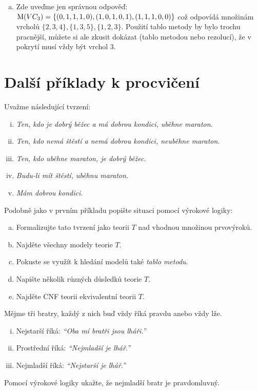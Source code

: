 \begin{problem}
\begin{solution}
\begin{enumerate}[(a)]
            \item Zde uveďme jen správnou odpověď: $\operatorname{M}(VC_3)=\{(0,1,1,1,0),(1,0,1,0,1),(1,1,1,0,0)\}$ což odpovídá množinám vrcholů $\{2,3,4\},\{1,3,5\},\{1,2,3\}$. Použití tablo metody by bylo trochu pracnější, můžete si ale zkusit dokázat (tablo metodou nebo rezolucí), že v pokrytí musí vždy být vrchol 3.
        \end{enumerate}
    \end{solution}

\end{problem}


\section*{Další příklady k procvičení}


\begin{problem}
    
    Uvažme následující tvrzení:
    \begin{enumerate}[(i)]
        \item {\it Ten, kdo je dobrý běžec a má dobrou kondici, uběhne maraton.}
        \item {\it Ten, kdo nemá štěstí a nemá dobrou kondici, neuběhne maraton.}
        \item {\it Ten, kdo uběhne maraton, je dobrý běžec.}
        \item {\it Budu-li mít štěstí, uběhnu maraton.}
        \item {\it Mám dobrou kondici.}
    \end{enumerate}
    Podobně jako v prvním příkladu popište situaci pomocí výrokové logiky:
    \begin{enumerate}[(a)]
        \item Formalizujte tato tvrzení jako teorii $T$ nad vhodnou množinou prvovýroků.
        \item Najděte všechny modely teorie $T$. 
        \item Pokuste se využít k hledání modelů také \emph{tablo metodu}.
        \item Napište několik různých důsledků teorie $T$.
        \item Najděte CNF teorii ekvivalentní teorii $T$.
    \end{enumerate}
    
\end{problem}


\begin{problem}

    Mějme tři bratry, každý z nich buď vždy říká pravdu anebo vždy lže.
    \begin{enumerate}[(i)]
        \item Nejstarší říká: \emph{``Oba mí bratři jsou lháři.''}
        \item Prostřední říká: \emph{``Nejmladší je lhář.''}
        \item Nejmladší říká: \emph{``Nejstarší je lhář.''}
    \end{enumerate}
    Pomocí výrokové logiky ukažte, že nejmladší bratr je pravdomluvný.
     
\end{problem}


